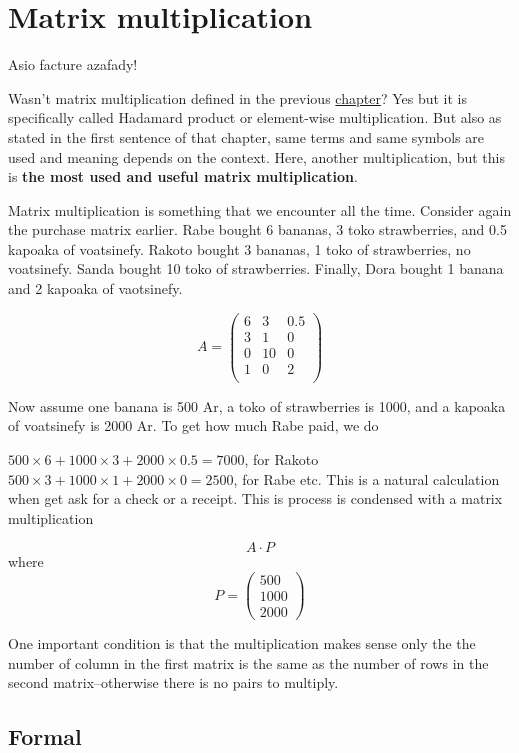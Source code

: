 \documentclass[
  letterpaper,
  DIV=11,
  numbers=noendperiod]{scrreprt}
\begin{document}
\chapter{Matrix multiplication}\label{sec-matrixMultiplicationMath}

Asio facture azafady!

Wasn't matrix multiplication defined in the previous
\href{@sec-matrixOperationCoding}{chapter}? Yes but it is specifically
called Hadamard product or element-wise multiplication. But also as
stated in the first sentence of that chapter, same terms and same
symbols are used and meaning depends on the context. Here, another
multiplication, but this is \textbf{the most used and useful matrix
multiplication}.

Matrix multiplication is something that we encounter all the time.
Consider again the purchase matrix earlier. Rabe bought 6 bananas, 3
toko strawberries, and 0.5 kapoaka of voatsinefy. Rakoto bought 3
bananas, 1 toko of strawberries, no voatsinefy. Sanda bought 10 toko of
strawberries. Finally, Dora bought 1 banana and 2 kapoaka of vaotsinefy.

\[
A = \begin{pmatrix}
    6 & 3 & 0.5 \\
    3 & 1 & 0 \\
    0 & 10 & 0 \\
    1 & 0 & 2 \\
\end{pmatrix}
\]

Now assume one banana is 500 Ar, a toko of strawberries is 1000, and a
kapoaka of voatsinefy is 2000 Ar. To get how much Rabe paid, we do

\(500 \times 6 + 1000 \times 3 + 2000 \times 0.5 = 7000\), for Rakoto
\(500 \times 3 + 1000 \times 1 + 2000 \times 0 = 2500\), for Rabe etc.
This is a natural calculation when get ask for a check or a receipt.
This is process is condensed with a matrix multiplication

\[
A \cdot P
\] where \[
P =
\begin{pmatrix}
    500 \\
    1000 \\
    2000
\end{pmatrix}
\]

One important condition is that the multiplication makes sense only the
the number of column in the first matrix is the same as the number of
rows in the second matrix--otherwise there is no pairs to multiply.

\section*{Formal}\label{formal-6}
\end{document}
